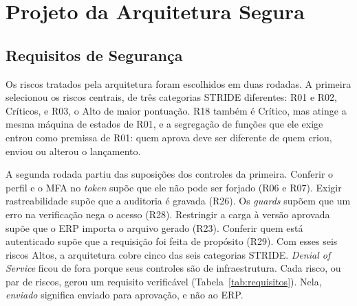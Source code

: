 \documentclass[conference]{IEEEtran}
\begin{document}
\section{Projeto da Arquitetura Segura}
\label{sec:arquitetura}

\subsection{Requisitos de Segurança}
\label{subsec:requisitos}

Os riscos tratados pela arquitetura foram escolhidos em duas rodadas. A primeira selecionou os riscos centrais, de três categorias STRIDE diferentes: R01 e R02, Críticos, e R03, o Alto de maior pontuação. R18 também é Crítico, mas atinge a mesma máquina de estados de R01, e a segregação de funções que ele exige entrou como premissa de R01: quem aprova deve ser diferente de quem criou, enviou ou alterou o lançamento.

A segunda rodada partiu das suposições dos controles da primeira. Conferir o perfil e o MFA no \textit{token} supõe que ele não pode ser forjado (R06 e R07). Exigir rastreabilidade supõe que a auditoria é gravada (R26). Os \textit{guards} supõem que um erro na verificação nega o acesso (R28). Restringir a carga à versão aprovada supõe que o ERP importa o arquivo gerado (R23). Conferir quem está autenticado supõe que a requisição foi feita de propósito (R29). Com esses seis riscos Altos, a arquitetura cobre cinco das seis categorias STRIDE. \textit{Denial of Service} ficou de fora porque seus controles são de infraestrutura. Cada risco, ou par de riscos, gerou um requisito verificável (Tabela~\ref{tab:requisitos}). Nela, \textit{enviado} significa enviado para aprovação, e não ao ERP.
\end{document}
